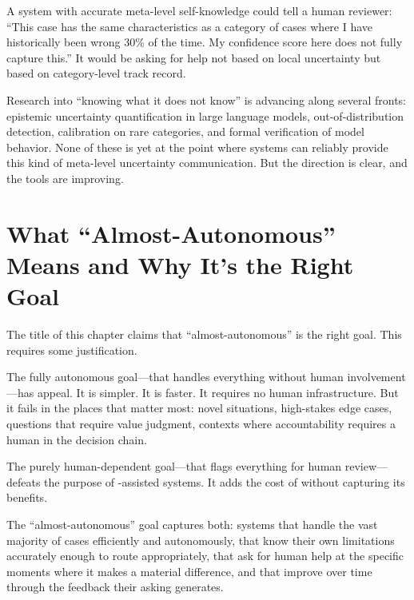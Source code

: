 A system with accurate meta-level self-knowledge could tell a human reviewer: ``This case has the same characteristics as a category of cases where I have historically been wrong 30\% of the time. My confidence score here does not fully capture this.'' It would be asking for help not based on local uncertainty but based on category-level track record.

Research into \ai ``knowing what it does not know'' is advancing along several fronts: epistemic uncertainty quantification in large language models, out-of-distribution detection, calibration on rare categories, and formal verification of model behavior. None of these is yet at the point where \ai systems can reliably provide this kind of meta-level uncertainty communication. But the direction is clear, and the tools are improving.

\section{What ``Almost-Autonomous'' Means and Why It's the Right Goal}
\label{sec:ch17-almost-autonomous}

The title of this chapter claims that ``almost-autonomous'' is the right goal. This requires some justification.

The fully autonomous goal---\ai that handles everything without human involvement---has appeal. It is simpler. It is faster. It requires no human infrastructure. But it fails in the places that matter most: novel situations, high-stakes edge cases, questions that require value judgment, contexts where accountability requires a human in the decision chain.

The purely human-dependent goal---\ai that flags everything for human review---defeats the purpose of \ai-assisted systems. It adds the cost of \ai without capturing its benefits.

The ``almost-autonomous'' goal captures both: \ai systems that handle the vast majority of cases efficiently and autonomously, that know their own limitations accurately enough to route appropriately, that ask for human help at the specific moments where it makes a material difference, and that improve over time through the feedback their asking generates.

